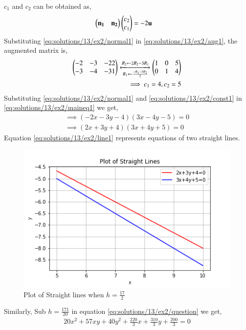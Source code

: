$c_1$ and $c_2$ can be obtained as,
\begin{align}
\begin{pmatrix}\mathbf{n_1} & \mathbf{n_2}\end{pmatrix}\begin{pmatrix}c_2\\c_1\end{pmatrix}&=-2\mathbf{u} \label{eq:solutions/13/ex2/aug1}
\end{align}
Substituting \eqref{eq:solutions/13/ex2/normal1} in \eqref{eq:solutions/13/ex2/aug1}, the augmented matrix is,
\begin{align}
\begin{pmatrix}-2 & -3 & -22 \\ -3 & -4 & -31\end{pmatrix}
\xleftrightarrow[R_1\leftarrow \frac{-R_1-3R_2}{2}]{R_2\leftarrow 2R_2-3R_1}
\begin{pmatrix}1 &0 &5 \\ 0& 1 & 4\end{pmatrix} \label{eq:solutions/13/ex2/aug2}\\
\implies c_1 = 4, c_2=5 \label{eq:solutions/13/ex2/const1}
\end{align}
Substituting \eqref{eq:solutions/13/ex2/normal1} and \eqref{eq:solutions/13/ex2/const1} in \eqref{eq:solutions/13/ex2/maineq1} we get,
\begin{multline}
\implies (-2x-3y-4)(3x-4y-5) = 0\\
\implies \boxed{(2x+3y+4)(3x+4y+5) = 0} \label{eq:solutions/13/ex2/line1}
\end{multline}
Equation \eqref{eq:solutions/13/ex2/line1} represents equations of two straight lines.\\
\begin{figure}[h!]
	\centering
	\includegraphics[width=\columnwidth]{./solutions/13/ex2/st1.png}
	\caption{Plot of Straight lines when $h=\frac{17}{2}$}
	\label{myfig1:solutions/13/ex2/}
\end{figure}


Similarly, Sub $h=\frac{171}{20}$ in equation \eqref{eq:solutions/13/ex2/question} we get,
\begin{align}
20x^2+57xy+40y^2+\frac{220}{3}x+\frac{310}{3}y+\frac{200}{3}=0 \label{eq:solutions/13/ex2/op2}
\end{align}

